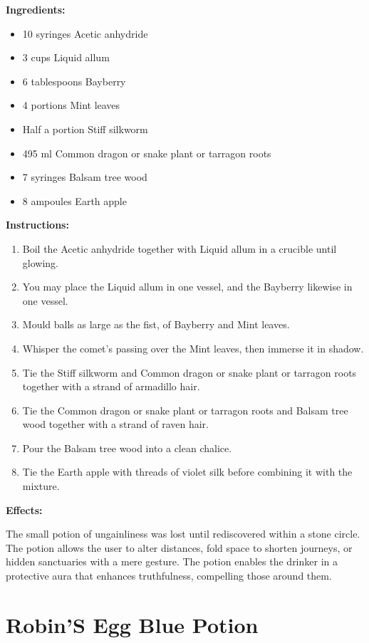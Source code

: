 \documentclass{article}
\begin{document}
\textbf{Ingredients:}

\begin{itemize}
  \item 10 syringes Acetic anhydride
  \item 3 cups Liquid allum
  \item 6 tablespoons Bayberry
  \item 4 portions Mint leaves
  \item Half a portion Stiff silkworm
  \item 495 ml Common dragon or snake plant or tarragon roots
  \item 7 syringes Balsam tree wood
  \item 8 ampoules Earth apple
\end{itemize}

\textbf{Instructions:}

\begin{enumerate}
  \item Boil the Acetic anhydride together with Liquid allum in a crucible until glowing.
  \item You may place the Liquid allum in one vessel, and the Bayberry likewise in one vessel.
  \item Mould balls as large as the fist, of Bayberry and Mint leaves.
  \item Whisper the comet’s passing over the Mint leaves, then immerse it in shadow.
  \item Tie the Stiff silkworm and Common dragon or snake plant or tarragon roots together with a strand of armadillo hair.
  \item Tie the Common dragon or snake plant or tarragon roots and Balsam tree wood together with a strand of raven hair.
  \item Pour the Balsam tree wood into a clean chalice.
  \item Tie the Earth apple with threads of violet silk before combining it with the mixture.
\end{enumerate}

\textbf{Effects:}

The small potion of ungainliness was lost until rediscovered within a stone circle. The potion allows the user to alter distances, fold space to shorten journeys, or hidden sanctuaries with a mere gesture. The potion enables the drinker in a protective aura that enhances truthfulness, compelling those around them.

\newpage
\section*{Robin'S Egg Blue Potion}
\end{document}

